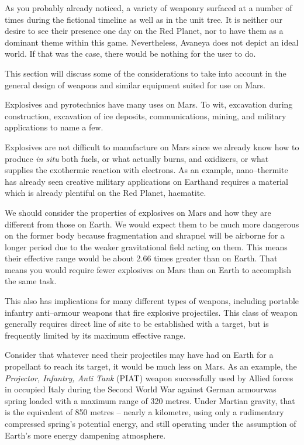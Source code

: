 

As you probably already noticed, a variety of weaponry surfaced at a number of times during the fictional timeline as well as in the unit tree. It is neither our desire to see their presence one day on the Red Planet, nor to have them as a dominant theme within this game. Nevertheless, Avaneya does not depict an ideal world. If that was the case, there would be nothing for the user to do. 

This section will discuss some of the considerations to take into account in the general design of weapons and similar equipment suited for use on Mars.


Explosives and pyrotechnics have many uses on Mars. To wit, excavation during construction, excavation of ice deposits, communications, mining, and military applications to name a few.

Explosives are not difficult to manufacture on Mars since we already know how to produce {\it in situ} both fuels, or what actually burns, and oxidizers, or what supplies the exothermic reaction with electrons. As an example, nano--thermite has already seen creative military applications on Earth\footnotecite[harrit2009] and requires a material which is already plentiful on the Red Planet, haematite.

We should consider the properties of explosives on Mars and how they are different from those on Earth. We would expect them to be much more dangerous on the former body because fragmentation and shrapnel will be airborne for a longer period due to the weaker gravitational field acting on them. This means their effective range would be about 2.66 times greater than on Earth. That means you would require fewer explosives on Mars than on Earth to accomplish the same task.

This also has implications for many different types of weapons, including portable infantry anti--armour weapons that fire explosive projectiles. This class of weapon generally requires direct line of site to be established with a target, but is frequently limited by its maximum effective range. 

Consider that whatever need their projectiles may have had on Earth for a propellant to reach its target, it would be much less on Mars. As an example, the {\it Projector, Infantry, Anti Tank} (PIAT) weapon successfully used by Allied forces in occupied Italy during the Second World War against German armour\footnotecite[extras={ p.~351.}][roy1965] was spring loaded with a maximum range of 320 metres. Under Martian gravity, that is the equivalent of 850 metres -- nearly a kilometre, using only a rudimentary compressed spring's potential energy, and still operating under the assumption of Earth's more energy dampening atmosphere.

